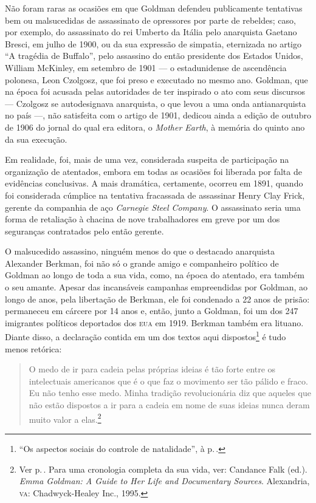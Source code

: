 Não foram raras
as ocasiões em que Goldman defendeu publicamente tentativas bem ou
malsucedidas de assassinato de opressores por parte de rebeldes; caso,
por exemplo, do assassinato do rei Umberto da Itália pelo anarquista
Gaetano Bresci, em julho de 1900, ou da sua expressão de simpatia,
eternizada no artigo ``A tragédia de Buffalo'', pelo assassino do então
presidente dos Estados Unidos, William McKinley, em setembro de 1901 ---
o estadunidense de ascendência polonesa, Leon Czolgosz, que foi preso e
executado no mesmo ano. Goldman, que na época foi acusada pelas
autoridades de ter inspirado o ato com seus discursos --- Czolgosz se
autodesignava anarquista, o que levou a uma onda antianarquista no país
---, não satisfeita com o artigo de 1901, dedicou ainda a edição de
outubro de 1906 do jornal do qual era editora, o \textit{Mother Earth}, à
memória do quinto ano da sua execução. 

Em realidade, foi, mais de uma
vez, considerada suspeita de participação na organização de atentados,
embora em todas as ocasiões foi liberada por falta de evidências
conclusivas. A mais dramática, certamente, ocorreu em 1891, quando foi
considerada cúmplice na tentativa fracassada de
assassinar Henry Clay Frick, gerente da companhia de aço
\emph{Carnegie Steel Company}. O assassinato seria uma forma de
retaliação à chacina de nove trabalhadores em greve por um dos
seguranças contratados pelo então gerente.

O malsucedido assassino,
ninguém menos do que o destacado anarquista Alexander Berkman, foi não
só o grande amigo e companheiro político de Goldman ao longo de toda a
sua vida, como, na época do atentado, era também o seu amante. Apesar
das incansáveis campanhas empreendidas por Goldman, ao longo de anos,
pela libertação de Berkman, ele foi condenado a 22 anos de
prisão: permaneceu em cárcere por 14 anos e, então,
junto a Goldman, foi um dos 247 imigrantes políticos deportados
dos \textsc{eua} em 1919. Berkman também era lituano. Diante disso, a declaração
contida em um dos textos aqui dispostos\footnote{``Os aspectos sociais do
controle de natalidade'', à p.\,\pageref{ref4}.} é tudo menos retórica:

\begin{quote}
O medo de ir para
cadeia pelas próprias ideias é tão forte entre os intelectuais
americanos que é o que faz o movimento ser tão pálido e fraco. Eu não
tenho esse medo. Minha tradição revolucionária diz que aqueles que não
estão dispostos a ir para a cadeia em nome de suas ideias nunca deram
muito valor a elas.\footnote{Ver p.\,\pageref{ref5}. Para uma cronologia completa da sua vida, ver: Candance Falk (ed.). \emph{Emma Goldman: A Guide to
  Her Life and Documentary Sources}. Alexandria, \textsc{va}: Chadwyck-Healey
  Inc., 1995.}
\end{quote}


